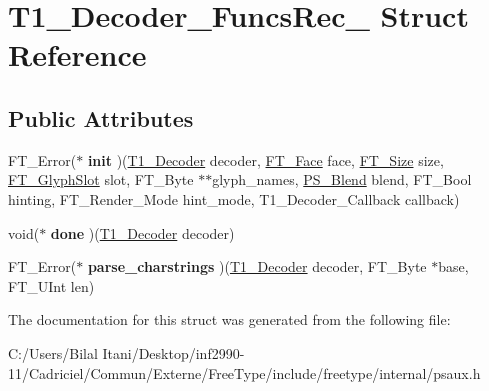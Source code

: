 \hypertarget{struct_t1___decoder___funcs_rec__}{}\section{T1\+\_\+\+Decoder\+\_\+\+Funcs\+Rec\+\_\+ Struct Reference}
\label{struct_t1___decoder___funcs_rec__}
\subsection*{Public Attributes}
\begin{DoxyCompactItemize}
\item 
F\+T\+\_\+\+Error($\ast$ {\bfseries init} )(\hyperlink{struct_t1___decoder_rec__}{T1\+\_\+\+Decoder} decoder, \hyperlink{struct_f_t___face_rec__}{F\+T\+\_\+\+Face} face, \hyperlink{struct_f_t___size_rec__}{F\+T\+\_\+\+Size} size, \hyperlink{struct_f_t___glyph_slot_rec__}{F\+T\+\_\+\+Glyph\+Slot} slot, F\+T\+\_\+\+Byte $\ast$$\ast$glyph\+\_\+names, \hyperlink{struct_p_s___blend_rec__}{P\+S\+\_\+\+Blend} blend, F\+T\+\_\+\+Bool hinting, F\+T\+\_\+\+Render\+\_\+\+Mode hint\+\_\+mode, T1\+\_\+\+Decoder\+\_\+\+Callback callback)\hypertarget{struct_t1___decoder___funcs_rec___ac6c6d5e56e3413bdb3802668e4ce3de7}{}\label{struct_t1___decoder___funcs_rec___ac6c6d5e56e3413bdb3802668e4ce3de7}

\item 
void($\ast$ {\bfseries done} )(\hyperlink{struct_t1___decoder_rec__}{T1\+\_\+\+Decoder} decoder)\hypertarget{struct_t1___decoder___funcs_rec___a766b605fd0a10755d9ce14d2bfea3bc5}{}\label{struct_t1___decoder___funcs_rec___a766b605fd0a10755d9ce14d2bfea3bc5}

\item 
F\+T\+\_\+\+Error($\ast$ {\bfseries parse\+\_\+charstrings} )(\hyperlink{struct_t1___decoder_rec__}{T1\+\_\+\+Decoder} decoder, F\+T\+\_\+\+Byte $\ast$base, F\+T\+\_\+\+U\+Int len)\hypertarget{struct_t1___decoder___funcs_rec___acef414b0ecbec6da63a11c1d94fb7c3e}{}\label{struct_t1___decoder___funcs_rec___acef414b0ecbec6da63a11c1d94fb7c3e}

\end{DoxyCompactItemize}


The documentation for this struct was generated from the following file\+:\begin{DoxyCompactItemize}
\item 
C\+:/\+Users/\+Bilal Itani/\+Desktop/inf2990-\/11/\+Cadriciel/\+Commun/\+Externe/\+Free\+Type/include/freetype/internal/psaux.\+h\end{DoxyCompactItemize}
